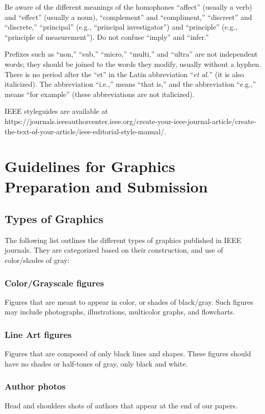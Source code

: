 \documentclass[journal,twoside,web]{ieeecolor}
\begin{document}
Be aware of the different meanings of the homophones ``affect'' (usually a 
verb) and ``effect'' (usually a noun), ``complement'' and ``compliment,'' 
``discreet'' and ``discrete,'' ``principal'' (e.g., ``principal 
investigator'') and ``principle'' (e.g., ``principle of measurement''). Do 
not confuse ``imply'' and ``infer.'' 

Prefixes such as ``non,'' ``sub,'' ``micro,'' ``multi,'' and ``ultra'' are 
not independent words; they should be joined to the words they modify, 
usually without a hyphen. There is no period after the ``et'' in the Latin 
abbreviation ``\emph{et al.}'' (it is also italicized). The abbreviation ``i.e.,'' means 
``that is,'' and the abbreviation ``e.g.,'' means ``for example'' (these 
abbreviations are not italicized).

IEEE styleguides are available at
https://journals.\discretionary{}{}{}ieeeauthorcenter.ieee.org/create-your-ieee-journal-article/\discretionary{}{}{}create-the-text-of-your-article/\discretionary{}{}{}ieee-editorial-style-manual/.

\section{Guidelines for Graphics Preparation and Submission}
\label{sec:guidelines}

\subsection{Types of Graphics}
The following list outlines the different types of graphics published in 
IEEE journals. They are categorized based on their construction, and use of 
color/shades of gray:

\subsubsection{Color/Grayscale figures}
{Figures that are meant to appear in color, or shades of black/gray. Such 
figures may include photographs, illustrations, multicolor graphs, and 
flowcharts.}

\subsubsection{Line Art figures}
{Figures that are composed of only black lines and shapes. These figures 
should have no shades or half-tones of gray, only black and white.}

\subsubsection{Author photos}
{Head and shoulders shots of authors that appear at the end of our papers. }
\end{document}
